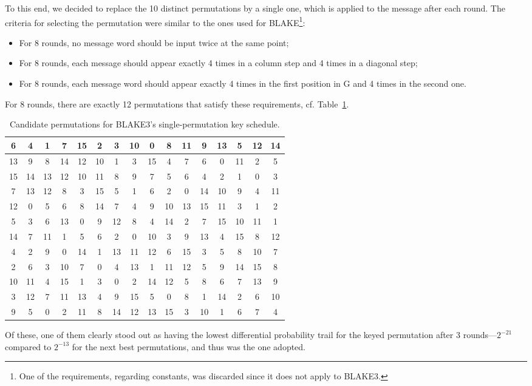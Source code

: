 \documentclass[11pt,notitlepage,a4paper]{article}
\begin{document}
To this end, we decided to replace the 10 distinct permutations by a single one, which is applied to the message after each round. The criteria for selecting the permutation were similar to the ones used for BLAKE\footnote{One of the requirements, regarding constants, was discarded since it does not apply to BLAKE3.}:
\begin{itemize}
  \item For 8 rounds, no message word should be input twice at the same point;
  \item For 8 rounds, each message should appear exactly 4 times in a column step and 4 times in a diagonal step;
  \item For 8 rounds, each message word should appear exactly 4 times in the first position in G and 4 times in the second one.
\end{itemize}
For 8 rounds, there are exactly 12 permutations that satisfy these requirements, cf. Table~\ref{tab:candidates}.
\begin{table}
\centering
\caption{Candidate permutations for BLAKE3's single-permutation key schedule.}\label{tab:candidates}
\begin{tabular}{cccccccccccccccc}
\toprule
6 & 4 & 1 & 7 & 15 & 2 & 3 & 10 & 0 & 8 & 11 & 9 & 13 & 5 & 12 & 14\\
\midrule
13 & 9 & 8 & 14 & 12 & 10 & 1 & 3 & 15 & 4 & 7 & 6 & 0 & 11 & 2 & 5\\
\midrule
15 & 14 & 13 & 12 & 10 & 11 & 8 & 9 & 7 & 5 & 6 & 4 & 2 & 1 & 0 & 3\\
\midrule
7 & 13 & 12 & 8 & 3 & 15 & 5 & 1 & 6 & 2 & 0 & 14 & 10 & 9 & 4 & 11\\
\midrule
12 & 0 & 5 & 6 & 8 & 14 & 7 & 4 & 9 & 10 & 13 & 15 & 11 & 3 & 1 & 2\\
\midrule
5 & 3 & 6 & 13 & 0 & 9 & 12 & 8 & 4 & 14 & 2 & 7 & 15 & 10 & 11 & 1\\
\midrule
14 & 7 & 11 & 1 & 5 & 6 & 2 & 0 & 10 & 3 & 9 & 13 & 4 & 15 & 8 & 12\\
\midrule
4 & 2 & 9 & 0 & 14 & 1 & 13 & 11 & 12 & 6 & 15 & 3 & 5 & 8 & 10 & 7\\
\midrule
2 & 6 & 3 & 10 & 7 & 0 & 4 & 13 & 1 & 11 & 12 & 5 & 9 & 14 & 15 & 8\\
\midrule
10 & 11 & 4 & 15 & 1 & 3 & 0 & 2 & 14 & 12 & 5 & 8 & 6 & 7 & 13 & 9\\
\midrule
3 & 12 & 7 & 11 & 13 & 4 & 9 & 15 & 5 & 0 & 8 & 1 & 14 & 2 & 6 & 10\\
\midrule
9 & 5 & 0 & 2 & 11 & 8 & 14 & 12 & 13 & 15 & 3 & 10 & 1 & 6 & 7 & 4\\ \bottomrule
\end{tabular}
\end{table}
Of these, one of them clearly stood out as having the lowest differential probability trail for the keyed permutation after 3 rounds---$2^{-21}$ compared to $2^{-13}$ for the next best permutations, and thus was the one adopted.
\end{document}
